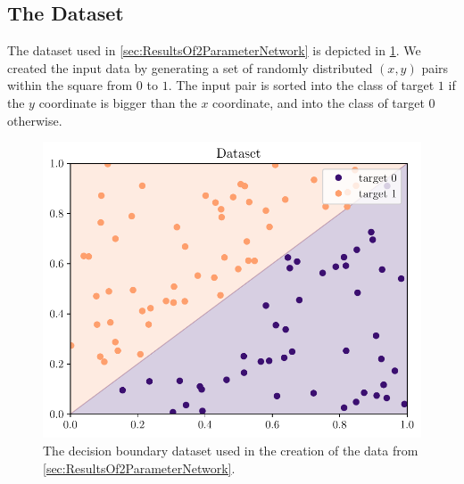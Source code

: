 \subsection{The Dataset}
The dataset used in \cref{sec:ResultsOf2ParameterNetwork} is depicted in \cref{fig:DB dataset}. We created the input data by generating a set of randomly distributed $(x,y)$ pairs within the square from $0$ to $1$. The input pair is sorted into the class of target $1$ if the $y$ coordinate is bigger than the $x$ coordinate, and into the class of target $0$ otherwise.
\begin{figure}
	\centering
	\includegraphics{Experiment2/plots/Dataset.pdf}
	\caption{The decision boundary dataset used in the creation of the data from \cref{sec:ResultsOf2ParameterNetwork}.}
	\label{fig:DB dataset}
\end{figure}

